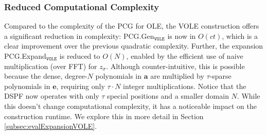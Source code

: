 \subsubsection{Reduced Computational Complexity}
Compared to the complexity of the PCG for OLE, the VOLE construction offers a significant reduction in complexity: PCG.Gen$_{\texttt{VOLE}}$ is now in $O(ct)$, which is a clear improvement over the previous quadratic complexity. Further, the expansion PCG.Expand$_{\texttt{VOLE}}$ is reduced to $O(N)$, enabled by the efficient use of naive multiplication (over FFT) for $z_\sigma$. Although counter-intuitive, this is possible because the dense, degree-$N$ polynomials in $\boldsymbol{a}$ are multiplied by $\tau$-sparse polynomials in $\boldsymbol{e}$, requiring only $\tau \cdot N$ integer multiplications. Notice that the DSPF now operates with only $\tau$ special positions and a smaller domain $N$. While this doesn't change computational complexity, it has a noticeable impact on the construction runtime. We explore this in more detail in Section \ref{subsec:evalExpansionVOLE}.